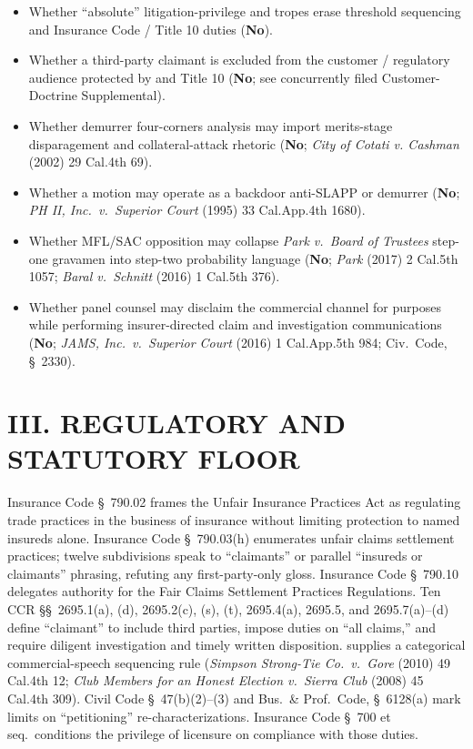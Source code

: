 \begin{itemize}
\tightlist
\item Whether ``absolute'' litigation-privilege and  tropes erase threshold  sequencing and Insurance Code / Title 10 duties (\textbf{No}).
\item Whether a third-party claimant is excluded from the customer / regulatory audience protected by  and Title 10 (\textbf{No}; see concurrently filed Customer-Doctrine Supplemental).
\item Whether demurrer four-corners analysis may import merits-stage disparagement and collateral-attack rhetoric (\textbf{No}; \textit{City of Cotati v. Cashman} (2002) 29 Cal.4th 69).
\item Whether a  motion may operate as a backdoor anti-SLAPP or demurrer (\textbf{No}; \textit{PH II, Inc.\ v.\ Superior Court} (1995) 33 Cal.App.4th 1680).
\item Whether MFL/SAC opposition may collapse \textit{Park v.\ Board of Trustees} step-one gravamen into step-two probability language (\textbf{No}; \textit{Park} (2017) 2 Cal.5th 1057; \textit{Baral v.\ Schnitt} (2016) 1 Cal.5th 376).
\item Whether panel counsel may disclaim the commercial channel for  purposes while performing insurer-directed claim and investigation communications (\textbf{No}; \textit{JAMS, Inc.\ v.\ Superior Court} (2016) 1 Cal.App.5th 984; Civ.\ Code, \S~2330).
\end{itemize}

\section*{III. REGULATORY AND STATUTORY FLOOR}

Insurance Code \S~790.02 frames the Unfair Insurance Practices Act as regulating trade practices in the business of insurance without limiting protection to named insureds alone. Insurance Code \S~790.03(h) enumerates unfair claims settlement practices; twelve subdivisions speak to ``claimants'' or parallel ``insureds or claimants'' phrasing, refuting any first-party-only gloss. Insurance Code \S~790.10 delegates authority for the Fair Claims Settlement Practices Regulations. Ten CCR \S\S~2695.1(a), (d), 2695.2(c), (s), (t), 2695.4(a), 2695.5, and 2695.7(a)--(d) define ``claimant'' to include third parties, impose duties on ``all claims,'' and require diligent investigation and timely written disposition.  supplies a categorical commercial-speech sequencing rule (\textit{Simpson Strong-Tie Co.\ v.\ Gore} (2010) 49 Cal.4th 12; \textit{Club Members for an Honest Election v.\ Sierra Club} (2008) 45 Cal.4th 309). Civil Code \S~47(b)(2)--(3) and Bus.\ \& Prof.\ Code, \S~6128(a) mark limits on ``petitioning'' re-characterizations. Insurance Code \S~700 et seq.\ conditions the privilege of licensure on compliance with those duties.

